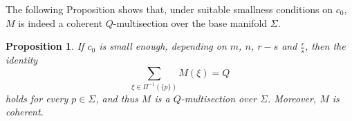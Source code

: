 \documentclass[a4paper,11pt,reqno]{amsart}
\newtheorem{proposition}[theorem]{Proposition}
\theoremstyle{definition}
\numberwithin{equation}{section}
\numberwithin{subsection}{section}
\newcommand{\Lip}{\mathrm{Lip}}
\newcommand{\bphi}{\boldsymbol{\varphi}}
\newcommand{\p}{\mathbf{p}}
\begin{document}
%
%
%
%

The following Proposition shows that, under suitable smallness conditions on $c_{0}$, $M$ is indeed a coherent $Q$-multisection over the base manifold $\Sigma$.

\begin{proposition} \label{well-posedness}
If $c_{0}$ is small enough, depending on $m$, $n$, $r - s$ and $\frac{r}{s}$, then the identity
\begin{equation} \label{well-posedness:eq}
\sum_{\xi \in \Pi^{-1}(\{p\})} M(\xi) = Q
\end{equation}
holds for every $p \in \Sigma$, and thus $M$ is a $Q$-multisection over $\Sigma$. Moreover, $M$ is coherent.
\end{proposition}
\end{document}
